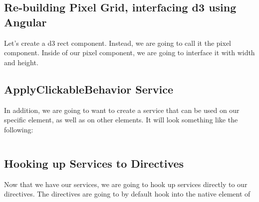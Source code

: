 \subsection{ Re-building Pixel Grid, interfacing d3 using Angular }
Let's create a d3 rect component. Instead, we are going to call it the pixel
component. Inside of our pixel component, we are going to interface it with
width and height.

\subsection{ ApplyClickableBehavior Service }
In addition, we are going to want to create a service that can be used on our
specific element, as well as on other elements. It will look something like
the following:
\begin{lstlisting}

\end{lstlisting}

\subsection{ Hooking up Services to Directives }
Now that we have our services, we are going to hook up services directly to
our directives. The directives are going to by default hook into the native
element of
